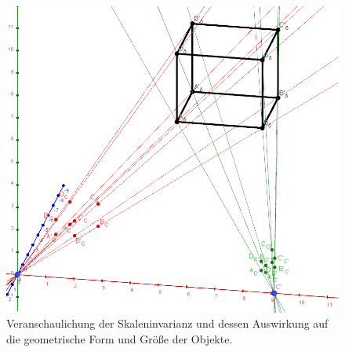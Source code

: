 \begin{figure}[!htb]
	\centering
	\includegraphics[width=0.40\linewidth]{images/ScaleInvariance_3.png}
	\caption[Skalierung der rekonstruierten Szene]{Veranschaulichung der Skaleninvarianz und dessen Auswirkung auf die geometrische Form und Größe der Objekte.} 
	\label{fig:scale3}
\end{figure}
\pagebreak



